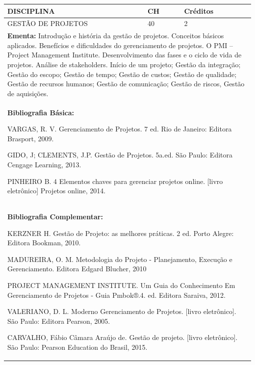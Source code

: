 \documentclass[a4paper, 12pt, openright, oneside, german, french, english, brazil]{abntex2}
\begin{document}
\begin{table}[!h]
  \footnotesize
  \centering
  \begin{tabular}{|p{100mm}|p{10mm}|p{20mm}|}
    \hline
    \textbf{DISCIPLINA} & \textbf{CH} & \textbf{Créditos} \\
    \hline
    GESTÃO DE PROJETOS & 40 & 2 \\
    \hline
    \multicolumn{3}{|p{130mm}|}{\textbf{Ementa:}  Introdução e história da gestão de projetos. Conceitos básicos aplicados. Benefícios e dificuldades do gerenciamento de projetos. O PMI – Project Management Institute. Desenvolvimento das fases e o ciclo de vida de projetos. Análise de stakeholders. Início de um projeto; Gestão da integração; Gestão do escopo; Gestão de tempo; Gestão de custos; Gestão de qualidade; Gestão de recursos humanos; Gestão de comunicação; Gestão de riscos, Gestão de aquisições. } \\
    \hline
    \multicolumn{3}{|p{130mm}|}{\textbf{Bibliografia Básica:}

    VARGAS, R. V. Gerenciamento de Projetos. 7 ed. Rio de Janeiro: Editora Brasport,
2009.

GIDO, J; CLEMENTS, J.P. Gestão de Projetos. 5a.ed. São Paulo: Editora Cengage
Learning, 2013.

PINHEIRO B. 4 Elementos chaves para gerenciar projetos online. [livro eletrônico]
Projetos online, 2014.
} \\
    \hline
    \multicolumn{3}{|p{130mm}|}{\textbf{Bibliografia Complementar:}

    KERZNER H. Gestão de Projeto: as melhores práticas. 2 ed. Porto Alegre: Editora
Bookman, 2010.

MADUREIRA, O. M. Metodologia do Projeto - Planejamento, Execução e
Gerenciamento. Editora Edgard Blucher, 2010

PROJECT MANAGEMENT INSTITUTE. Um Guia do Conhecimento Em
Gerenciamento de Projetos - Guia Pmbok®.4. ed. Editora Saraiva, 2012.

VALERIANO, D. L. Moderno Gerenciamento de Projetos. [livro eletrônico]. São
Paulo: Editora Pearson, 2005.

CARVALHO, Fábio Câmara Araújo de. Gestão de projeto. [livro eletrônico]. São
Paulo: Pearson Education do Brasil, 2015.
} \\
    \hline
  \end{tabular}
\end{table}
\end{document}
